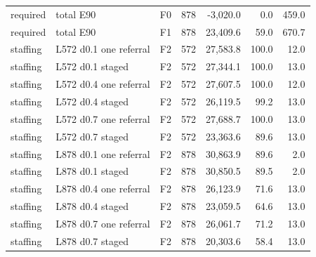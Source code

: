 \begin{longtable}{p{1.8cm}p{3.35cm}lrrrr}
required & total E90 & F0 & 878 & -3,020.0 & 0.0 & 459.0\\
required & total E90 & F1 & 878 & 23,409.6 & 59.0 & 670.7\\
staffing & L572 d0.1 one referral & F2 & 572 & 27,583.8 & 100.0 & 12.0\\
staffing & L572 d0.1 staged & F2 & 572 & 27,344.1 & 100.0 & 13.0\\
staffing & L572 d0.4 one referral & F2 & 572 & 27,607.5 & 100.0 & 12.0\\
staffing & L572 d0.4 staged & F2 & 572 & 26,119.5 & 99.2 & 13.0\\
staffing & L572 d0.7 one referral & F2 & 572 & 27,688.7 & 100.0 & 13.0\\
staffing & L572 d0.7 staged & F2 & 572 & 23,363.6 & 89.6 & 13.0\\
staffing & L878 d0.1 one referral & F2 & 878 & 30,863.9 & 89.6 & 2.0\\
staffing & L878 d0.1 staged & F2 & 878 & 30,850.5 & 89.5 & 2.0\\
staffing & L878 d0.4 one referral & F2 & 878 & 26,123.9 & 71.6 & 13.0\\
staffing & L878 d0.4 staged & F2 & 878 & 23,059.5 & 64.6 & 13.0\\
staffing & L878 d0.7 one referral & F2 & 878 & 26,061.7 & 71.2 & 13.0\\
staffing & L878 d0.7 staged & F2 & 878 & 20,303.6 & 58.4 & 13.0\\
\bottomrule\end{longtable}
